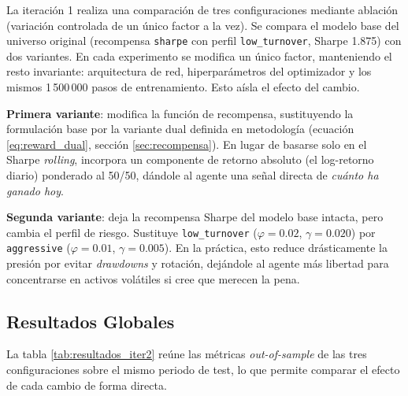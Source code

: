 \documentclass[IB,a4paper]{TFUOC}
\begin{document}
La iteración 1 realiza una comparación de tres configuraciones mediante ablación (variación controlada de un único factor a la vez). Se compara el modelo base del universo original (recompensa \texttt{sharpe} con perfil \texttt{low\_turnover}, Sharpe 1.875) con dos variantes. En cada experimento se modifica un único factor, manteniendo el resto invariante: arquitectura de red, hiperparámetros del optimizador y los mismos 1\,500\,000 pasos de entrenamiento. Esto aísla el efecto del cambio.

\textbf{Primera variante}: modifica la función de recompensa, sustituyendo la formulación base por la variante dual definida en metodología (ecuación \eqref{eq:reward_dual}, sección \ref{sec:recompensa}). En lugar de basarse solo en el Sharpe \textit{rolling}, incorpora un componente de retorno absoluto (el log-retorno diario) ponderado al 50/50, dándole al agente una señal directa de \textit{cuánto ha ganado hoy}.

\textbf{Segunda variante}: deja la recompensa Sharpe del modelo base intacta, pero cambia el perfil de riesgo. Sustituye \texttt{low\_turnover} ($\varphi = 0.02$, $\gamma = 0.020$) por \texttt{aggressive} ($\varphi = 0.01$, $\gamma = 0.005$). En la práctica, esto reduce drásticamente la presión por evitar \textit{drawdowns} y rotación, dejándole al agente más libertad para concentrarse en activos volátiles si cree que merecen la pena.

\subsection{Resultados Globales}

La tabla \ref{tab:resultados_iter2} reúne las métricas \textit{out-of-sample} de las tres configuraciones sobre el mismo periodo de test, lo que permite comparar el efecto de cada cambio de forma directa.
\end{document}
